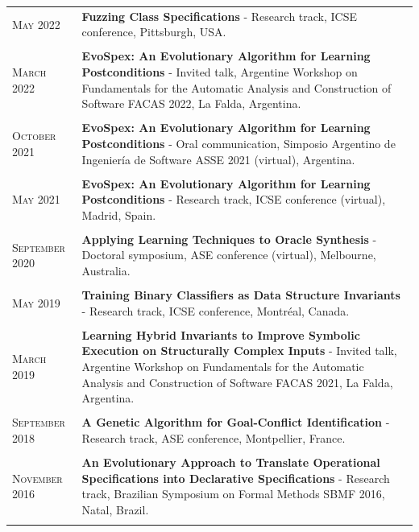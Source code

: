 \documentclass[a4paper,10pt]{article} %
\begin{document}
\begin{longtable}{>{\raggedleft\arraybackslash}p{} p{}}
\textsc{May} 2022 & \textbf{Fuzzing Class Specifications} - Research track, ICSE conference, Pittsburgh, USA. \\ & \\

\textsc{March} 2022 & \textbf{EvoSpex: An Evolutionary Algorithm for Learning Postconditions} - Invited talk, Argentine Workshop on Fundamentals for the Automatic Analysis and Construction of Software FACAS 2022, La Falda, Argentina. \\ & \\

\textsc{October} 2021 & \textbf{EvoSpex: An Evolutionary Algorithm for Learning Postconditions} - Oral communication, Simposio Argentino de Ingeniería de Software ASSE 2021 (virtual), Argentina.\\ & \\

\textsc{May} 2021 & \textbf{EvoSpex: An Evolutionary Algorithm for Learning Postconditions} - Research track, ICSE conference (virtual), Madrid, Spain. \\ & \\

\textsc{September} 2020 & \textbf{Applying Learning Techniques to Oracle Synthesis} - Doctoral symposium, ASE conference (virtual), Melbourne, Australia. \\ & \\

\textsc{May} 2019 & \textbf{Training Binary Classifiers as Data Structure Invariants} - Research track, ICSE conference, Montréal, Canada. \\ & \\

\textsc{March} 2019 & \textbf{Learning Hybrid Invariants to Improve Symbolic Execution on Structurally Complex Inputs} - Invited talk, Argentine Workshop on Fundamentals for the Automatic Analysis and Construction of Software FACAS 2021, La Falda, Argentina. \\ & \\

\textsc{September} 2018 & \textbf{A Genetic Algorithm for Goal-Conflict Identification} - Research track, ASE conference, Montpellier, France. \\ & \\

\textsc{November} 2016 & \textbf{An Evolutionary Approach to Translate Operational Specifications into Declarative Specifications} - Research track, Brazilian Symposium on Formal Methods SBMF 2016, Natal, Brazil. \\ & \\

\end{longtable}
\end{document}
